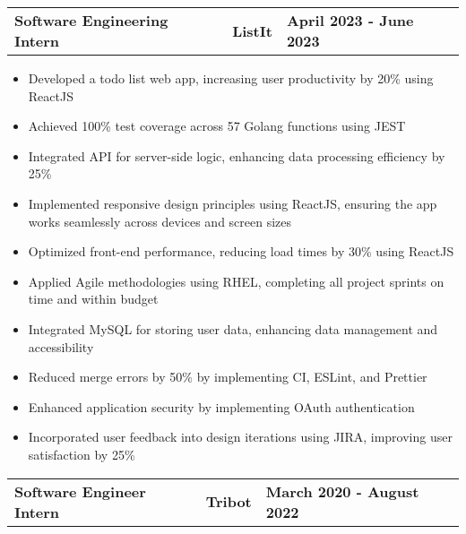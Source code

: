 \documentclass[a4paper,10pt]{article}
\begin{document}
\vspace{10pt}
\begin{tabularx}{\textwidth}{@{} >{\raggedright\arraybackslash}X >{\centering\arraybackslash}X >{\raggedleft\arraybackslash}X @{} }
\textbf{Software Engineering Intern} & \textbf{ListIt} & \textbf{April 2023 - June 2023} \\
\end{tabularx}
\begin{itemize}[leftmargin=*,label=\textbullet]
  \item Developed a todo list web app, increasing user productivity by 20\% using ReactJS
  \item Achieved 100\% test coverage across 57 Golang functions using JEST
  \item Integrated API for server-side logic, enhancing data processing efficiency by 25\%
  \item Implemented responsive design principles using ReactJS, ensuring the app works seamlessly across devices and screen sizes
  \item Optimized front-end performance, reducing load times by 30\% using ReactJS
  \item Applied Agile methodologies using RHEL, completing all project sprints on time and within budget
  \item Integrated MySQL for storing user data, enhancing data management and accessibility
  \item Reduced merge errors by 50\% by implementing CI, ESLint, and Prettier
  \item Enhanced application security by implementing OAuth authentication
  \item Incorporated user feedback into design iterations using JIRA, improving user satisfaction by 25\%
\end{itemize}
\vspace{10pt}
\begin{tabularx}{\textwidth}{@{} >{\raggedright\arraybackslash}X >{\centering\arraybackslash}X >{\raggedleft\arraybackslash}X @{} }
\textbf{Software Engineer Intern} & \textbf{Tribot} & \textbf{March 2020 - August 2022} \\
\end{tabularx}
\end{document}
